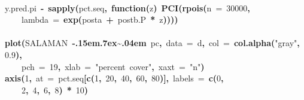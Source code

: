 \documentclass{article}
\makeatletter
\newcommand{\hlnumber}[1]{\textcolor[rgb]{0,0,0}{#1}}%
\newcommand{\hlfunctioncall}[1]{\textcolor[rgb]{.5,0,.33}{\textbf{#1}}}%
\newcommand{\hlstring}[1]{\textcolor[rgb]{.6,.6,1}{#1}}%
\newcommand{\hlkeyword}[1]{\textbf{#1}}%
\newcommand{\hlargument}[1]{\textcolor[rgb]{.69,.25,.02}{#1}}%
\newcommand{\hlformalargs}[1]{\hlargument{#1}}%
\newcommand{\hlassignement}[1]{\textbf{#1}}%
\newcommand{\hlsymbol}[1]{#1}%
\def\urltilda{\kern -.15em\lower .7ex\hbox{\~{}}\kern .04em}%
\newcommand{\hlstd}[1]{\textcolor[rgb]{0,0,0}{#1}}%
\newenvironment{kframe}{%
 \def\FrameCommand##1{\hskip\@totalleftmargin \hskip-\fboxsep
 \colorbox{shadecolor}{##1}\hskip-\fboxsep
     \hskip-\linewidth \hskip-\@totalleftmargin \hskip\columnwidth}%
 \MakeFramed {\advance\hsize-\width
   \@totalleftmargin\z@ \linewidth\hsize
   \@setminipage}}%
 {\par\unskip\endMakeFramed}
\newenvironment{knitrout}{}{} %
\makeatother
\begin{document}
\begin{knitrout}
{\begin{kframe}
\begin{flushleft}
\hlstd{}\hspace*{\fill}\\
\hlstd{}\hlsymbol{y.pred.pi}{\ }\hlassignement{\usebox{\hlnormalsizeboxlessthan}-}{\ }\hlfunctioncall{sapply}\hlkeyword{(}\hlsymbol{pct.seq}\hlkeyword{,}{\ }\hlkeyword{function}\hlkeyword{(}\hlformalargs{z}\hlkeyword{)}{\ }\hlfunctioncall{PCI}\hlkeyword{(}\hlfunctioncall{rpois}\hlkeyword{(}\hlargument{n}{\ }\hlargument{=}{\ }\hlnumber{30000}\hlkeyword{,}\hspace*{\fill}\\
\hlstd{}{\ }{\ }{\ }{\ }\hlargument{lambda}{\ }\hlargument{=}{\ }\hlfunctioncall{exp}\hlkeyword{(}\hlsymbol{post}\hlkeyword{\usebox{\hlnormalsizeboxdollar}}\hlsymbol{a}{\ }\hlkeyword{+}{\ }\hlsymbol{post}\hlkeyword{\usebox{\hlnormalsizeboxdollar}}\hlsymbol{b.P}{\ }\hlkeyword{*}{\ }\hlsymbol{z}\hlkeyword{)}\hlkeyword{)}\hlkeyword{)}\hlkeyword{)}\hspace*{\fill}\\
\hlstd{}\hspace*{\fill}\\
\hlstd{}\hlfunctioncall{plot}\hlkeyword{(}\hlsymbol{SALAMAN}{\ }\hlkeyword{\urltilda{}}{\ }\hlsymbol{pc}\hlkeyword{,}{\ }\hlargument{data}{\ }\hlargument{=}{\ }\hlsymbol{d}\hlkeyword{,}{\ }\hlargument{col}{\ }\hlargument{=}{\ }\hlfunctioncall{col.alpha}\hlkeyword{(}\hlstring{"gray"}\hlkeyword{,}{\ }\hlnumber{0.9}\hlkeyword{)}\hlkeyword{,}\hspace*{\fill}\\
\hlstd{}{\ }{\ }{\ }{\ }\hlargument{pch}{\ }\hlargument{=}{\ }\hlnumber{19}\hlkeyword{,}{\ }\hlargument{xlab}{\ }\hlargument{=}{\ }\hlstring{"percent{\ }cover"}\hlkeyword{,}{\ }\hlargument{xaxt}{\ }\hlargument{=}{\ }\hlstring{"n"}\hlkeyword{)}\hspace*{\fill}\\
\hlstd{}\hlfunctioncall{axis}\hlkeyword{(}\hlnumber{1}\hlkeyword{,}{\ }\hlargument{at}{\ }\hlargument{=}{\ }\hlsymbol{pct.seq}\hlkeyword{[}\hlfunctioncall{c}\hlkeyword{(}\hlnumber{1}\hlkeyword{,}{\ }\hlnumber{20}\hlkeyword{,}{\ }\hlnumber{40}\hlkeyword{,}{\ }\hlnumber{60}\hlkeyword{,}{\ }\hlnumber{80}\hlkeyword{)}\hlkeyword{]}\hlkeyword{,}{\ }\hlargument{labels}{\ }\hlargument{=}{\ }\hlfunctioncall{c}\hlkeyword{(}\hlnumber{0}\hlkeyword{,}\hspace*{\fill}\\
\hlstd{}{\ }{\ }{\ }{\ }\hlnumber{2}\hlkeyword{,}{\ }\hlnumber{4}\hlkeyword{,}{\ }\hlnumber{6}\hlkeyword{,}{\ }\hlnumber{8}\hlkeyword{)}{\ }\hlkeyword{*}{\ }\hlnumber{10}\hlkeyword{)}\hspace*{\fill}\\

\end{flushleft}
\end{kframe}}
\end{knitrout}
\end{document}
